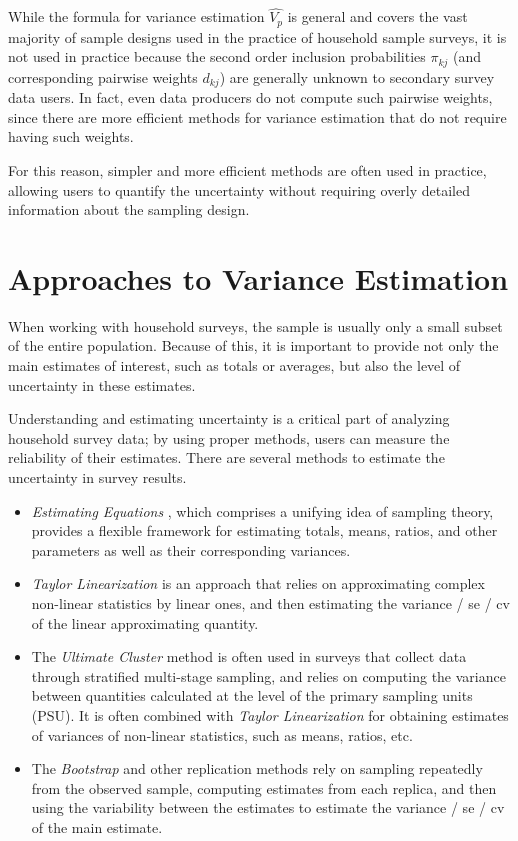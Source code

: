 \documentclass[
  12pt,
]{book}
\begin{document}
While the formula for variance estimation \(\widehat {V_p}\) is general and covers the vast majority of sample designs used in the practice of household sample surveys, it is not used in practice because the second order inclusion probabilities \(\pi_{kj}\) (and corresponding pairwise weights \(d_{kj}\)) are generally unknown to secondary survey data users. In fact, even data producers do not compute such pairwise weights, since there are more efficient methods for variance estimation that do not require having such weights.

For this reason, simpler and more efficient methods are often used in practice, allowing users to quantify the uncertainty without requiring overly detailed information about the sampling design.

\hypertarget{approaches-to-variance-estimation}{%
\section{Approaches to Variance Estimation}\label{approaches-to-variance-estimation}}

When working with household surveys, the sample is usually only a small subset of the entire population. Because of this, it is important to provide not only the main estimates of interest, such as totals or averages, but also the level of uncertainty in these estimates.

Understanding and estimating uncertainty is a critical part of analyzing household survey data; by using proper methods, users can measure the reliability of their estimates. There are several methods to estimate the uncertainty in survey results.

\begin{itemize}
\item
  \emph{Estimating Equations} \citep{Binder1983}, which comprises a unifying idea of sampling theory, provides a flexible framework for estimating totals, means, ratios, and other parameters as well as their corresponding variances.
\item
  \emph{Taylor Linearization} is an approach that relies on approximating complex non-linear statistics by linear ones, and then estimating the variance / se / cv of the linear approximating quantity.
\item
  The \emph{Ultimate Cluster} method is often used in surveys that collect data through stratified multi-stage sampling, and relies on computing the variance between quantities calculated at the level of the primary sampling units (PSU). It is often combined with \emph{Taylor Linearization} for obtaining estimates of variances of non-linear statistics, such as means, ratios, etc.
\item
  The \emph{Bootstrap} and other replication methods rely on sampling repeatedly from the observed sample, computing estimates from each replica, and then using the variability between the estimates to estimate the variance / se / cv of the main estimate.
\end{itemize}
\end{document}
